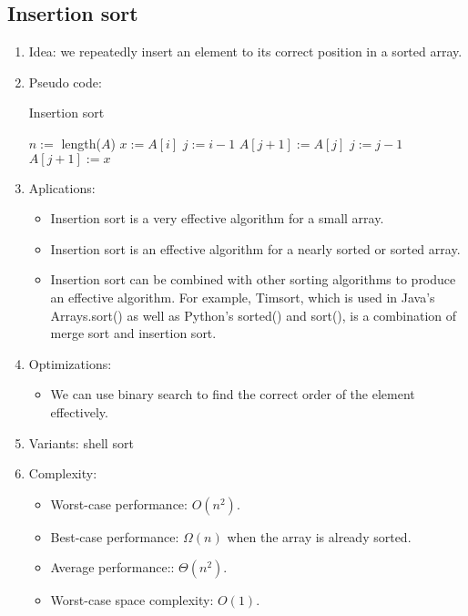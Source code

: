 \documentclass[12pt]{article}
\begin{document}
    \subsection{Insertion sort}
    \begin{enumerate}
        \item Idea: we repeatedly insert an element to its correct position in a sorted array.
        \item Pseudo code:
        \begin{algorithm}[H]
            \caption{Insertion sort}
            \begin{algorithmic}[1]
                    \State $n:=$ length($A$)
                        \State $x:=A[i]$
                        \State $j:=i-1$
                            \State $A[j+1]:=A[j]$
                            \State $j:=j-1$
                        \EndWhile
                        \State $A[j+1]:=x$
                    \EndFor
                \EndFunction
            \end{algorithmic}
        \end{algorithm}
        \item Aplications:
        \begin{itemize}
            \item Insertion sort is a very effective algorithm for a small array.
            \item Insertion sort is an effective algorithm for a nearly sorted or sorted array.
            \item Insertion sort can be combined with other sorting algorithms to produce an effective algorithm. For example, Timsort, which is used in Java’s Arrays.sort() as well as Python’s sorted() and sort(), is a combination of merge sort and insertion sort.
        \end{itemize}
        \item Optimizations:
        \begin{itemize}
            \item We can use binary search to find the correct order of the element effectively.
        \end{itemize}
        \item Variants: shell sort
        \item Complexity:
        \begin{itemize}
            \item Worst-case performance: $O(n^2)$.
            \item Best-case performance: $\Omega(n)$ when the array is already sorted.
            \item Average performance:: $\Theta(n^2)$.
            \item Worst-case space complexity: $O(1)$.
        \end{itemize}
    \end{enumerate}
\end{document}

